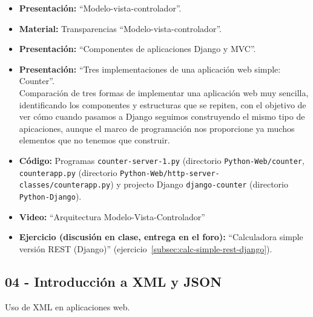 \documentclass[a4paper,12pt]{article}
\begin{document}
\begin{itemize}
\item \textbf{Presentación:} ``Modelo-vista-controlador''.
\item \textbf{Material:} Transparencias ``Modelo-vista-controlador''.
\item \textbf{Presentación:} ``Componentes de aplicaciones Django y MVC''.

\item \textbf{Presentación:} ``Tres implementaciones de una aplicación web simple: Counter''. \\
  Comparación de tres formas de implementar una aplicación web muy sencilla, identificando los componentes y estructuras que se repiten, con el objetivo de ver cómo cuando pasamos a Django seguimos construyendo el mismo tipo de apicaciones, aunque el marco de programación nos proporcione ya muchos elementos que no tenemos que construir.
\item \textbf{Código:} Programas \verb|counter-server-1.py| (directorio \verb|Python-Web/counter|, \verb|counterapp.py| (directorio \verb|Python-Web/http-server-classes/counterapp.py|) y projecto Django \verb|django-counter| (directorio \verb|Python-Django|).

\item \textbf{Video:} ``Arquitectura Modelo-Vista-Controlador''

\item \textbf{Ejercicio (discusión en clase, entrega en el foro):} ``Calculadora simple versión REST (Django)'' (ejercicio~\ref{subsec:calc-simple-rest-django}). \\
%

\end{itemize}


\subsection{04 - Introducción a XML y JSON}

Uso de XML en aplicaciones web.

\end{document}
